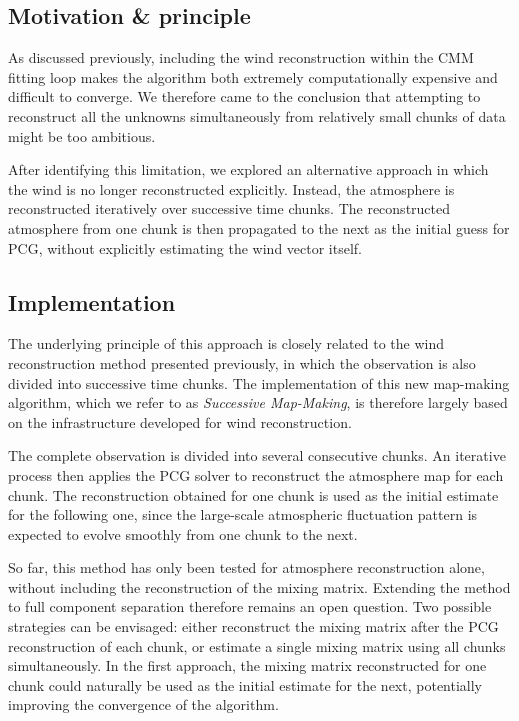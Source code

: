 \documentclass[a4paper,11pt]{article}
\begin{document}
\subsection{Motivation \& principle}

As discussed previously, including the wind reconstruction within the CMM fitting loop makes the algorithm both extremely computationally expensive and difficult to converge. We therefore came to the conclusion that attempting to reconstruct all the unknowns simultaneously from relatively small chunks of data might be too ambitious.

After identifying this limitation, we explored an alternative approach in which the wind is no longer reconstructed explicitly. Instead, the atmosphere is reconstructed iteratively over successive time chunks. The reconstructed atmosphere from one chunk is then propagated to the next as the initial guess for PCG, without explicitly estimating the wind vector itself.

\subsection{Implementation}

The underlying principle of this approach is closely related to the wind reconstruction method presented previously, in which the observation is also divided into successive time chunks. The implementation of this new map-making algorithm, which we refer to as \emph{Successive Map-Making}, is therefore largely based on the infrastructure developed for wind reconstruction.

The complete observation is divided into several consecutive chunks. An iterative process then applies the PCG solver to reconstruct the atmosphere map for each chunk. The reconstruction obtained for one chunk is used as the initial estimate for the following one, since the large-scale atmospheric fluctuation pattern is expected to evolve smoothly from one chunk to the next.

So far, this method has only been tested for atmosphere reconstruction alone, without including the reconstruction of the mixing matrix. Extending the method to full component separation therefore remains an open question. Two possible strategies can be envisaged: either reconstruct the mixing matrix after the PCG reconstruction of each chunk, or estimate a single mixing matrix using all chunks simultaneously. In the first approach, the mixing matrix reconstructed for one chunk could naturally be used as the initial estimate for the next, potentially improving the convergence of the algorithm.
\end{document}
